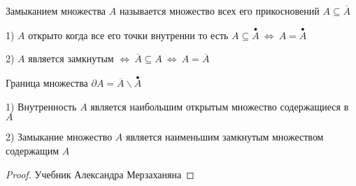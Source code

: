 \begin{define}[Замыкания]
  Замыканием множества $A$ называется множество всех его прикосновений
  $A \subseteq \overline{A}$
\end{define}

\begin{block}[Следствие]
  1) $A$ открыто когда все его точки внутренни то есть
  $A \subseteq \stackrel{\bullet}{A} ~ \Leftrightarrow ~
  A = \stackrel{\bullet}{A}$

  2) $A$ является замкнутым $\Leftrightarrow ~ \overline{A} \subseteq A ~
  \Leftrightarrow ~ A = \overline{A}$
\end{block}

\begin{define}
  Граница множества $\partial A = \overline{A} \backslash \stackrel{\bullet}{A}$
\end{define}

\begin{theorem}
  1) Внутренность $A$ является наибольшим открытым множество
  содержащиеся в $A$

  2) Замыкание множество $A$ является наименьшим замкнутым множеством
  содержащим $A$
\end{theorem}

\begin{proof}
  Учебник Александра Мерзаханяна
\end{proof}

